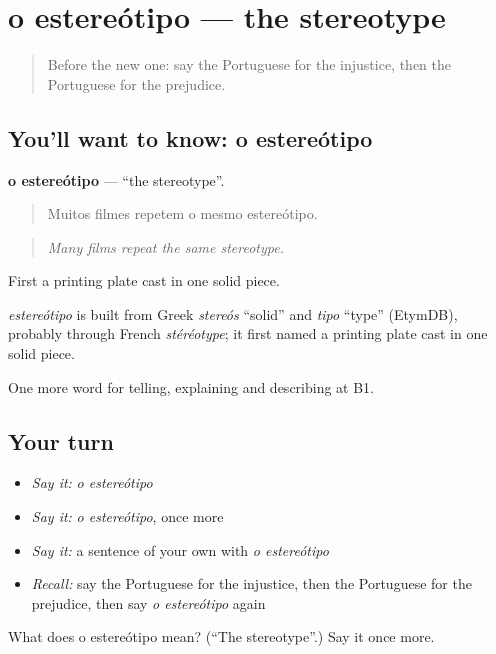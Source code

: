 \section[o estereótipo]{o estereótipo — the stereotype}

\label{lesson:PT-C365-estereotipo}



\begin{quote}
Before the new one: say the Portuguese for the injustice, then the Portuguese for the prejudice.
\end{quote}

\subsection*{You'll want to know: o estereótipo}
\textbf{o estereótipo} — \textquotedblleft{}the stereotype\textquotedblright{}.

\begin{quote}
Muitos filmes repetem o mesmo estereótipo.
\end{quote}

\begin{quote}
\emph{Many films repeat the same stereotype.}
\end{quote}

First a printing plate cast in one solid piece.

\begin{cousinweb}
\emph{estereótipo} is built from Greek \emph{stereós} \textquotedblleft{}solid\textquotedblright{} and \emph{tipo} \textquotedblleft{}type\textquotedblright{} (EtymDB), probably through French \emph{stéréotype}; it first named a printing plate cast in one solid piece.
\end{cousinweb}

\begin{grammarlens}[title={What you've built}]
One more word for telling, explaining and describing at B1.
\end{grammarlens}

\subsection*{Your turn}
\begin{itemize}
\raggedright
  \item \emph{Say it:} \emph{o estereótipo}
  \item \emph{Say it:} \emph{o estereótipo}, once more
  \item \emph{Say it:} a sentence of your own with \emph{o estereótipo}
  \item \emph{Recall:} say the Portuguese for the injustice, then the Portuguese for the prejudice, then say \emph{o estereótipo} again
\end{itemize}

\begin{tcolorbox}[breakable,colback=teal!4,colframe=teal!35!black,title={Before you move on}]
What does o estereótipo mean? (\textquotedblleft{}The stereotype\textquotedblright{}.) Say it once more.
\end{tcolorbox}
